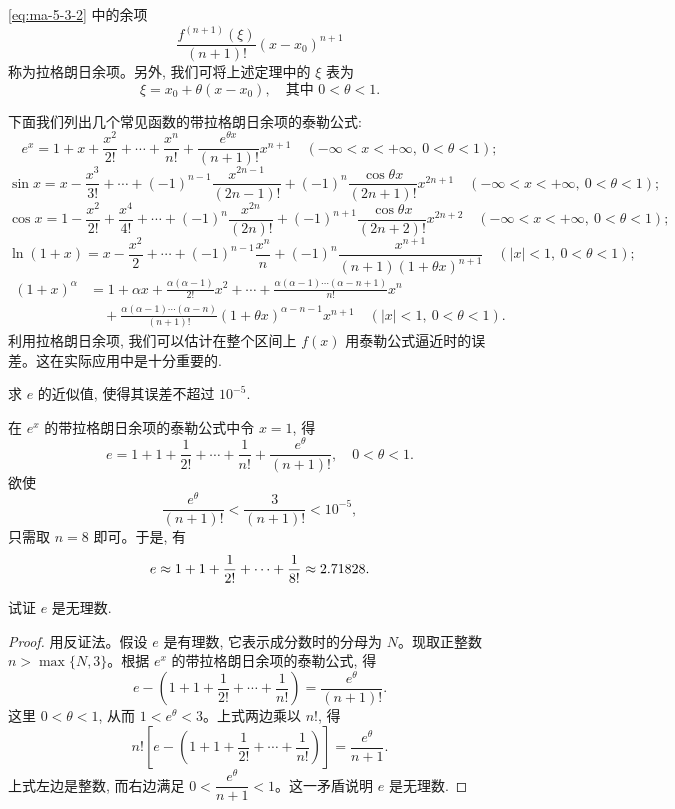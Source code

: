 \begin{remark}\label{remark:ma-5-source-91}
\eqref{eq:ma-5-3-2} 中的余项
\[
  \frac{f^{(n+1)}(\xi)}{(n+1)!}(x-x_0)^{n+1}
\]
称为拉格朗日余项。另外, 我们可将上述定理中的 $\xi$ 表为
\[
  \xi=x_0+\theta(x-x_0),\quad \text{其中 }0<\theta<1.
\]
\end{remark}

下面我们列出几个常见函数的带拉格朗日余项的泰勒公式:
\[
  e^x=1+x+\frac{x^2}{2!}+\cdots+\frac{x^n}{n!}+\frac{e^{\theta x}}{(n+1)!}x^{n+1}
  \quad (-\infty<x<+\infty,\ 0<\theta<1);
\]
\[
  \sin x=x-\frac{x^3}{3!}+\cdots+(-1)^{n-1}\frac{x^{2n-1}}{(2n-1)!}
  +(-1)^n\frac{\cos\theta x}{(2n+1)!}x^{2n+1}
  \quad (-\infty<x<+\infty,\ 0<\theta<1);
\]
\[
  \cos x=1-\frac{x^2}{2!}+\frac{x^4}{4!}+\cdots+(-1)^n\frac{x^{2n}}{(2n)!}
  +(-1)^{n+1}\frac{\cos\theta x}{(2n+2)!}x^{2n+2}
  \quad (-\infty<x<+\infty,\ 0<\theta<1);
\]
\[
  \ln(1+x)=x-\frac{x^2}{2}+\cdots+(-1)^{n-1}\frac{x^n}{n}
  +(-1)^n\frac{x^{n+1}}{(n+1)(1+\theta x)^{n+1}}
  \quad (|x|<1,\ 0<\theta<1);
\]
\[
\begin{aligned}
  (1+x)^\alpha
  &=
  1+\alpha x+\frac{\alpha(\alpha-1)}{2!}x^2+\cdots
  +\frac{\alpha(\alpha-1)\cdots(\alpha-n+1)}{n!}x^n \\
  &\quad+
  \frac{\alpha(\alpha-1)\cdots(\alpha-n)}{(n+1)!}(1+\theta x)^{\alpha-n-1}x^{n+1}
  \quad (|x|<1,\ 0<\theta<1).
\end{aligned}
\]
利用拉格朗日余项, 我们可以估计在整个区间上 $f(x)$ 用泰勒公式逼近时的误差。这在实际应用中是十分重要的.

\begin{example}\label{example:ma-5-3-13}
求 $e$ 的近似值, 使得其误差不超过 $10^{-5}$.
\end{example}


\begin{solve}
在 $e^x$ 的带拉格朗日余项的泰勒公式中令 $x=1$, 得
\[
  e=1+1+\frac1{2!}+\cdots+\frac1{n!}+\frac{e^\theta}{(n+1)!},\quad 0<\theta<1.
\]
欲使
\[
  \frac{e^\theta}{(n+1)!}<\frac3{(n+1)!}<10^{-5},
\]
只需取 $n=8$ 即可。于是, 有
\[
  e\approx1+1+\frac1{2!}+\cdots+\frac1{8!}\approx2.71828.
\qedhere
\]
\end{solve}


\begin{example}\label{example:ma-5-3-14}
试证 $e$ 是无理数.
\end{example}


\begin{proof}
用反证法。假设 $e$ 是有理数, 它表示成分数时的分母为 $N$。现取正整数 $n>\max\{N,3\}$。根据 $e^x$ 的带拉格朗日余项的泰勒公式, 得
\[
  e-\left(1+1+\frac1{2!}+\cdots+\frac1{n!}\right)=\frac{e^\theta}{(n+1)!}.
\]
这里 $0<\theta<1$, 从而 $1<e^\theta<3$。上式两边乘以 $n!$, 得
\[
  n!\left[e-\left(1+1+\frac1{2!}+\cdots+\frac1{n!}\right)\right]
  =
  \frac{e^\theta}{n+1}.
\]
上式左边是整数, 而右边满足 $0<\dfrac{e^\theta}{n+1}<1$。这一矛盾说明 $e$ 是无理数.
\end{proof}


